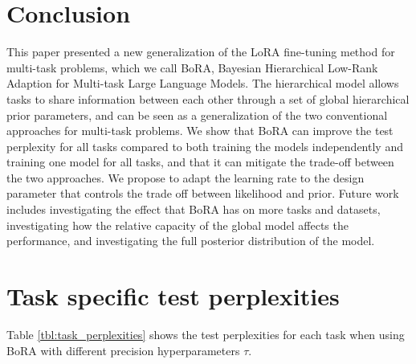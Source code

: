 \documentclass[fullpaper]{nldl}
\begin{document}
\section{Conclusion}
This paper presented a new generalization of the LoRA fine-tuning method for multi-task problems, which we call BoRA,  Bayesian Hierarchical Low-Rank Adaption for Multi-task
Large Language Models. The hierarchical model allows tasks to share information between each other through a set of global hierarchical prior parameters, and can be seen as a generalization of the two conventional approaches for multi-task problems. We show that BoRA can improve the test perplexity for all tasks compared to both training the models independently and training one model for all tasks, and that it can mitigate the trade-off between the two approaches. We propose to adapt the learning rate to the design parameter that controls the trade off between likelihood and prior. 
Future work includes investigating the effect that BoRA has on more tasks and datasets, investigating how the relative capacity of the global model affects the performance, and investigating the full posterior distribution of the model.

\printbibliography

\appendix
\section{Task specific test perplexities}
Table \ref{tbl:task_perplexities} shows the test perplexities for each task when using BoRA with different precision hyperparameters $\tau$.
\end{document}
